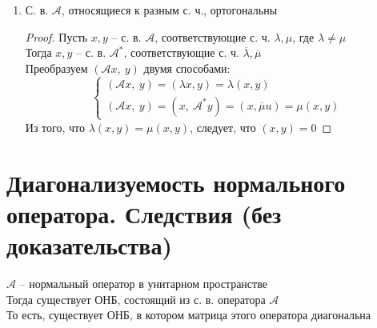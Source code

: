 \begin{properties}
\begin{enumerate}
		\begin{proof}
			Нужно доказать, что $ \mathcal{A}v = \lambda v \iff \mathcal{A}^*v = \lambda x $ \\
			Положим $ \mathcal{B} \define \mathcal{A} - \lambda \mathcal{E} $ \\
			Тогда $ \mathcal{B}^* = \mathcal{A}^* - \overline\lambda\mathcal{E} $ \\
			Нужно доказать, что $ \mathcal{B}x = 0 \iff \mathcal{B}^*x = 0 $ \\
			По (\ref{en:472}), оператор $ \mathcal{B} $ нормальный. Применим (\ref{en:471}):
			$$ \mathcal{B}x = 0 \iff |\mathcal{B}x| = 0 \iff |\mathcal{B}^*x| = 0 \iff \mathcal{B}^*x = 0 $$
		\end{proof}
		\item С. в. $ \mathcal{A} $, относящиеся к разным с. ч., ортогональны
		\begin{proof}
			Пусть $ x, y $ -- с. в. $ \mathcal{A} $, соответствующие с. ч. $ \lambda, \mu $, где $ \lambda \ne \mu $ \\
			Тогда $ x, y $ -- с. в. $ \mathcal{A}^* $, соответствующие с. ч. $ \overline\lambda, \overline\mu $ \\
			Преобразуем $ (\mathcal{A}x, ~ y) $ двумя способами:
			$$
			\begin{cases}
				(\mathcal{A}x, ~ y) = (\lambda x, y) = \lambda(x, y) \\
				(\mathcal{A}x, ~ y) = (x, ~ \mathcal{A}^*y) = (x, \overline\mu u) = \mu(x, y)
			\end{cases} $$
			Из того, что $ \lambda(x, y) = \mu(x, y) $, следует, что $ (x, y) = 0 $
		\end{proof}
	\end{enumerate}
\end{properties}

\section{Диагонализуемость нормального оператора. Следствия (без доказательства)}

\begin{theorem}
	$ \mathcal{A} $ -- нормальный оператор в унитарном пространстве \\
	Тогда существует ОНБ, состоящий из с. в. оператора $ \mathcal{A} $ \\
	То есть, существует ОНБ, в котором матрица этого оператора диагональна
\end{theorem}

